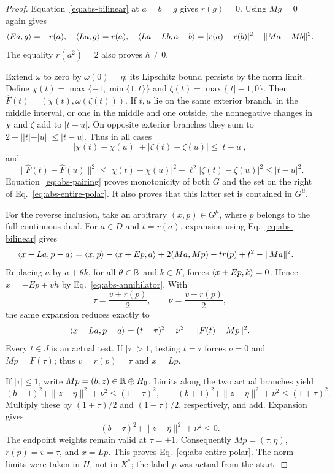 \begin{proof}
Equation~\eqref{eq:abs-bilinear} at $a=b=g$ gives $r(g)=0$.
Using $Mg=0$ again gives
\begin{equation}
\langle Ea,g\rangle=-r(a),\quad \langle La,g\rangle=r(a),\quad
\langle La-Lb,a-b\rangle=|r(a)-r(b)|^2-\|Ma-Mb\|^2.
\label{eq:abs-pairing}
\end{equation}
The equality $r(a^2)=2$ also proves $h\ne0$.

Extend $\omega$ to zero by $\omega(0)=\eta$; its Lipschitz bound
persists by the norm limit. Define
$\chi(t)=\max\{-1,\min\{1,t\}\}$ and
$\zeta(t)=\max\{|t|-1,0\}$. Then
$\widehat F(t)=(\chi(t),\omega(\zeta(t)))$.
If $t,u$ lie on the same exterior branch, in the middle interval,
or one in the middle and one outside, the nonnegative changes in
$\chi$ and $\zeta$ add to $|t-u|$. On opposite exterior branches
they sum to $2+||t|-|u||\le|t-u|$. Thus in all cases
\[
|\chi(t)-\chi(u)|+|\zeta(t)-\zeta(u)|\le|t-u|,
\]
and
\[
\|\widehat F(t)-\widehat F(u)\|^2
\le|\chi(t)-\chi(u)|^2+\ell^2|\zeta(t)-\zeta(u)|^2
\le|t-u|^2.
\]
Equation~\eqref{eq:abs-pairing} proves monotonicity of both $G$
and the set on the right of Eq.~\eqref{eq:abs-entire-polar}.
It also proves that this latter set is contained in $G^\mu$.

For the reverse inclusion, take an arbitrary $(x,p)\in G^\mu$,
where $p$ belongs to the full continuous dual. For $a\in D$ and
$t=r(a)$, expansion using Eq.~\eqref{eq:abs-bilinear} gives
\begin{align*}
\langle x-La,p-a\rangle
={}&\langle x,p\rangle-\langle x+Ep,a\rangle
       +2(Ma,Mp)-t r(p)+t^2-\|Ma\|^2.
\end{align*}
Replacing $a$ by $a+\theta k$, for all $\theta\in\mathbb R$ and
$k\in K$, forces $\langle x+Ep,k\rangle=0$. Hence
$x=-Ep+v h$ by Eq.~\eqref{eq:abs-annihilator}. With
\[
\tau=\frac{v+r(p)}2,\qquad \nu=\frac{v-r(p)}2,
\]
the same expansion reduces exactly to
\begin{equation}
\langle x-La,p-a\rangle=(t-\tau)^2-\nu^2-\|F(t)-Mp\|^2.
\label{eq:abs-polar-square}
\end{equation}
Every $t\in J$ is an actual test. If $|\tau|>1$, testing
$t=\tau$ forces $\nu=0$ and $Mp=F(\tau)$; thus
$v=r(p)=\tau$ and $x=Lp$.

If $|\tau|\le1$, write $Mp=(b,z)\in\mathbb R\oplus H_0$.
Limits along the two actual branches yield
\[
(b-1)^2+\|z-\eta\|^2+\nu^2\le(1-\tau)^2,
\qquad
(b+1)^2+\|z-\eta\|^2+\nu^2\le(1+\tau)^2.
\]
Multiply these by $(1+\tau)/2$ and $(1-\tau)/2$, respectively,
and add. Expansion gives
\[
(b-\tau)^2+\|z-\eta\|^2+\nu^2\le0.
\]
The endpoint weights remain valid at $\tau=\pm1$.
Consequently $Mp=(\tau,\eta)$, $r(p)=v=\tau$, and $x=Lp$.
This proves Eq.~\eqref{eq:abs-entire-polar}. The norm limits were
taken in $H$, not in $X^*$; the label $p$ was actual from the start.


\end{proof}
